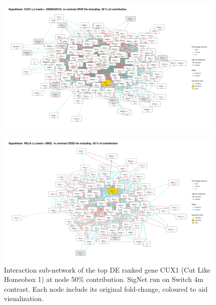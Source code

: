 \begin{figure}[!h]
    \centering
    \includegraphics[width=\textwidth, height=\textheight, keepaspectratio]{Major Thesis/figures/iut/graph/3R4F46m50-CUX1.png}
    \caption{}
\end{figure}


\begin{figure}[!h]
    \centering
    \includegraphics[width=\textwidth, height=\textheight, keepaspectratio]{Major Thesis/figures/iut/graph/CESS4m50-RELA.png}
    \caption{Interaction sub-network of the top DE ranked gene CUX1 (Cut Like Homeobox 1) at node 50\% contribution. SigNet run on Switch 4m contrast. Each node include its original fold-change, coloured to aid visualization.}
\end{figure}

